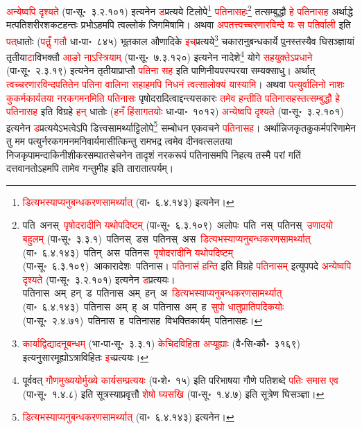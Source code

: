 \begin{sloppypar}
\textcolor{red}{अन्येष्वपि दृश्यते} (पा॰सू॰~३.२.१०१) इत्यनेन \textcolor{red}{ड}\-प्रत्यये टिलोपे\footnote{\textcolor{red}{डित्यभस्याप्यनु\-बन्धकरण\-सामर्थ्यात्‌} (वा॰~६.४.१४३) इत्यनेन।} \textcolor{red}{पतिनासहः}\footnote{पति~अनस्‌~\arrow \textcolor{red}{पृषोदरादीनि यथोपदिष्टम्} (पा॰सू॰~६.३.१०९)~\arrow अलोपः~\arrow पति~नस्~\arrow पतिनस्~\arrow \textcolor{red}{उणादयो बहुलम्} (पा॰सू॰~३.३.१)~\arrow पतिनस्~डस~\arrow पतिनस्~अस~\arrow \textcolor{red}{डित्यभस्याप्यनु\-बन्धकरण\-सामर्थ्यात्‌} (वा॰~६.४.१४३)~\arrow पतिन्~अस~\arrow पतिनस~\arrow \textcolor{red}{पृषोदरादीनि यथोपदिष्टम्} (पा॰सू॰~६.३.१०९)~\arrow आकारादेशः~\arrow पतिनास। \textcolor{red}{पतिनासं हन्ति} इति विग्रहे \textcolor{red}{पतिनासम्} इत्युपपदे \textcolor{red}{अन्येष्वपि दृश्यते} (पा॰सू॰~३.२.१०१) इत्यनेन \textcolor{red}{ड}\-प्रत्ययः। पतिनास~अम्~हन्~ड~\arrow पतिनास~अम्~हन्~अ~\arrow \textcolor{red}{डित्यभस्याप्यनु\-बन्धकरण\-सामर्थ्यात्‌} (वा॰~६.४.१४३)~\arrow पतिनास~अम्~ह्~अ~\arrow पतिनास~अम्~ह~\arrow \textcolor{red}{सुपो धातु\-प्रातिपदिकयोः} (पा॰सू॰~२.४.७१)~\arrow पतिनास~ह~\arrow पतिनासह~\arrow विभक्ति\-कार्यम्~\arrow पतिनासहः।} तत्सम्बुद्धौ \textcolor{red}{हे पतिनासह} अर्थाद्धे मत्पति\-शरीर\-शकट\-हन्तः प्रभोऽहमपि त्वल्लोकं जिगमिषामि। अथवा \textcolor{red}{अपतत्त्वच्चरणारविन्दे यः स पतिर्वाली} इति \textcolor{red}{पत्‌}\-धातोः (\textcolor{red}{पतॢँ गतौ} धा॰पा॰~८४५) भूतकाल औणादिके \textcolor{red}{इच्‌}प्रत्यये\footnote{\textcolor{red}{कार्याद्विद्यादनूबन्धम्} (भा॰पा॰सू॰~३.३.१) \textcolor{red}{केचिदविहिता अप्यूह्याः} (वै॰सि॰कौ॰~३१६९) इत्यनुसारमूह्योऽ\-त्राविहितः \textcolor{red}{इच्}\-प्रत्ययः।} चकारानुबन्ध\-कार्ये पुनस्तस्यैव घि\-सञ्ज्ञायां तृतीया\-\textcolor{red}{टा}\-विभक्तौ \textcolor{red}{आङो नाऽस्त्रियाम्‌} (पा॰सू॰~७.३.१२०) इत्यनेन नादेशे\footnote{पूर्ववत् \textcolor{red}{गौण\-मुख्ययोर्मुख्ये कार्य\-सम्प्रत्ययः} (प॰शे॰~१५) इति परिभाषया गौणे पति\-शब्दे \textcolor{red}{पतिः समास एव} (पा॰सू॰~१.४.८) इति सूत्रस्याप्रवृत्तौ \textcolor{red}{शेषो घ्यसखि} (पा॰सू॰~१.४.७) इति सूत्रेण घि\-सञ्ज्ञा।} योगे \textcolor{red}{सह\-युक्तेऽप्रधाने} (पा॰सू॰~२.३.१९) इत्यनेन तृतीयाप्राप्तौ \textcolor{red}{पतिना सह} इति पाणिनीयपरम्परया सम्यक्साधु। अर्थात् \textcolor{red}{त्वच्चरणारविन्द\-पतितेन पतिना वालिना सहाहमपि निधनं त्वत्सालोक्यं यास्यामि}। अथवा \textcolor{red}{पत्युर्वालिनो नाशः कुकर्म\-कार्यतया नरक\-गमनमिति पतिनासः} पृषोदरादित्वाद्दन्त्य\-सकारः \textcolor{red}{तमेव हन्तीति पतिनासहस्तत्सम्बुद्धौ हे पतिनासह} इति विग्रहे 
\textcolor{red}{हन्‌} धातोः (\textcolor{red}{हनँ हिंसा\-गतयोः} धा॰पा॰~१०१२) \textcolor{red}{अन्येष्वपि दृश्यते} (पा॰सू॰~३.२.१०१) इत्यनेन
\textcolor{red}{ड}\-प्रत्ययेऽभत्वेऽपि
डित्त्व\-सामर्थ्याट्टिलोपे\footnote{\textcolor{red}{डित्यभस्याप्यनु\-बन्धकरण\-सामर्थ्यात्‌} (वा॰~६.४.१४३) इत्यनेन।} सम्बोधन एकवचने \textcolor{red}{पतिनासह}। अर्थान्निज\-कृत\-कुकर्म\-परिणामेन तु मम पत्युर्नरक\-गमनमनिवार्यमासीत्किन्तु रामभद्र त्वमेव दीन\-वत्सलतया निज\-कृपा\-मन्दाकिनी\-शीकर\-सम्पात\-सेचनेन तादृशं नरक\-रूपं पतिनासमपि निहत्य तस्मै परां गतिं दत्तवानतोऽहमपि तामेव गन्तुमीह इति तारा\-तात्पर्यम्।\end{sloppypar}
